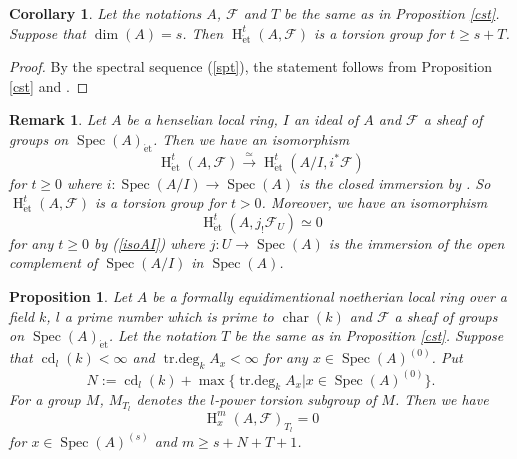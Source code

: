 \documentclass{article}
\newtheorem{prop}[thm]{\indent \sc Proposition}
\newtheorem{cor}[thm]{\indent \sc Corollary}
\newtheorem{rem}[thm]{\indent \sc Remark}
\newcommand{\spec}{\operatorname{Spec}}
\newcommand{\et}{\mathrm{\acute{e}t}}
\newcommand{\HO}{\operatorname{H}}
\begin{document}
%
\begin{cor}\upshape\label{cdt}
Let the notations $A$, $\mathcal{F}$ and $T$  be the same as in
Proposition \ref{cst}. Suppose that
$\operatorname{dim}(A)=s$. Then
$\HO^{t}_{\et}(A, \mathcal{F})$
is a torsion group for $t\geq s+T$.
\end{cor}
%

%
\begin{proof}\upshape
By the spectral sequence (\ref{spt}),
the statement follows from Proposition \ref{cst}
and \cite[p.93, III, Corollary 1.28]{M}.
\end{proof}
%

%
\begin{rem}\upshape\label{HenTor}
Let $A$ be a henselian local ring,
$I$ an ideal of $A$
and $\mathcal{F}$ a sheaf of groups on
$\spec(A)_{\et}$. Then we have an isomorphism
%
\begin{equation}\label{isoAI}
\HO^{t}_{\et}(A, \mathcal{F})
\xrightarrow{\simeq}
\HO^{t}_{\et}(A/I, i^{*}\mathcal{F})
\end{equation}
%
for $t\geq 0$ where
$i: \spec(A/I)\to \spec(A)$
is the closed immersion
by 
\cite[p.777, The proof of Proposition 2.2.b)]{Ge}.
So 
$\HO^{t}_{\et}(A, \mathcal{F})$
is a torsion group for $t>0$.
Moreover, we have an isomorphism
%
\begin{equation*}
\HO^{t}_{\et}(
A,
j_{!}\mathcal{F}_{U}
)    
\simeq 
0
\end{equation*}
%
for any $t\geq 0$ by (\ref{isoAI})
where
$j: U\to\spec(A)$ is the immersion of the open
complement of $\spec(A/I)$ in
$\spec(A)$.
\end{rem}
%





%
\begin{prop}\upshape\label{cdpt}
Let $A$ be a formally  equidimentional noetherian local ring over a field $k$,
$l$ a prime number which is prime to $\operatorname{char}(k)$ and 
$\mathcal{F}$ a sheaf of groups on $\spec(A)_{\et}$.
Let the notation $T$ be the same as in Proposition \ref{cst}.
Suppose that $\operatorname{cd}_{l}(k)<\infty$
and
$\operatorname{tr.deg}_{k}A_{x}<\infty$ for any $x\in \spec(A)^{(0)}$.
Put 
%
\begin{equation*}
N:=\operatorname{cd}_{l}(k)
+
\max\{\operatorname{tr.deg}_{k}A_{x} | x\in\spec(A)^{(0)}\}.
\end{equation*}
%
%
For a group $M$, 
$M_{T_{l}}$ denotes the $l$-power torsion subgroup of $M$.
Then we have
%
\begin{equation*}
\HO^{m}_{x}(A,
\mathcal{F}
)_{T_{l}}
=0
\end{equation*}
%
for $x\in \spec(A)^{(s)}$ and $m\geq s+N+T+1$.
\end{prop}
%
\end{document}
